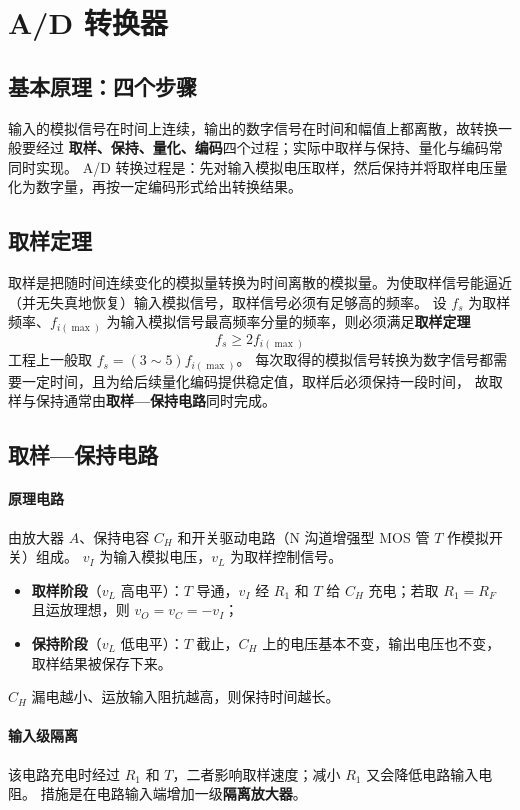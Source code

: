 \section{A/D 转换器}
\subsection{基本原理：四个步骤}
输入的模拟信号在时间上连续，输出的数字信号在时间和幅值上都离散，故转换一般要经过
\textbf{取样、保持、量化、编码}四个过程；实际中取样与保持、量化与编码常同时实现。
A/D 转换过程是：先对输入模拟电压取样，然后保持并将取样电压量化为数字量，再按一定编码形式给出转换结果。

\subsection{取样定理}
取样是把随时间连续变化的模拟量转换为时间离散的模拟量。为使取样信号能逼近（并无失真地恢复）输入模拟信号，取样信号必须有足够高的频率。
设 $f_s$ 为取样频率、$f_{i(\max)}$ 为输入模拟信号最高频率分量的频率，则必须满足\textbf{取样定理}
\[
f_s\ge2f_{i(\max)}
\]
工程上一般取 $f_s=(3\sim5)f_{i(\max)}$。
每次取得的模拟信号转换为数字信号都需要一定时间，且为给后续量化编码提供稳定值，取样后必须保持一段时间，
故取样与保持通常由\textbf{取样—保持电路}同时完成。

\subsection{取样—保持电路}
\paragraph{原理电路}
由放大器 $A$、保持电容 $C_H$ 和开关驱动电路（N 沟道增强型 MOS 管 $T$ 作模拟开关）组成。
$v_I$ 为输入模拟电压，$v_L$ 为取样控制信号。
\begin{itemize}
    \item \textbf{取样阶段}（$v_L$ 高电平）：$T$ 导通，$v_I$ 经 $R_1$ 和 $T$ 给 $C_H$ 充电；若取 $R_1=R_F$ 且运放理想，则 $v_O=v_C=-v_I$；
    \item \textbf{保持阶段}（$v_L$ 低电平）：$T$ 截止，$C_H$ 上的电压基本不变，输出电压也不变，取样结果被保存下来。
\end{itemize}
$C_H$ 漏电越小、运放输入阻抗越高，则保持时间越长。

\paragraph{输入级隔离}
该电路充电时经过 $R_1$ 和 $T$，二者影响取样速度；减小 $R_1$ 又会降低电路输入电阻。
措施是在电路输入端增加一级\textbf{隔离放大器}。

